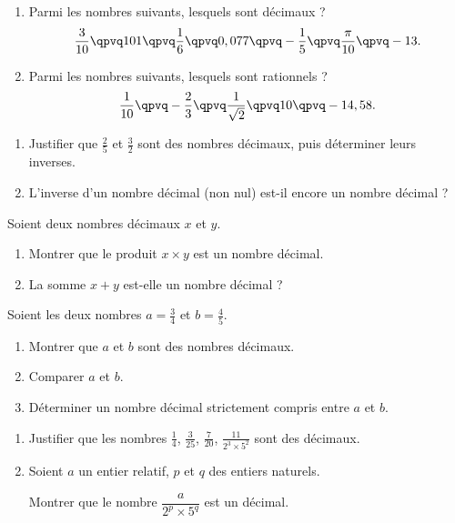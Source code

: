 
\exo

\begin{enumerate}
\item Parmi les nombres suivants, lesquels sont décimaux ?
\[\frac{3}{10} \qpvq 101 \qpvq \frac{1}{6} \qpvq 0,077 \qpvq -\frac{1}{5} \qpvq \frac{\pi}{10} \qpvq -13.\]
\item Parmi les nombres suivants, lesquels sont rationnels ?
\[\frac{1}{10} \qpvq -\frac{2}{3} \qpvq \frac{1}{\sqrt{2}} \qpvq 10 \qpvq -14,58.\]
\end{enumerate}

\exo

\begin{enumerate}
\item Justifier que $\frac{2}{5}$ et $\frac{3}{2}$ sont des nombres décimaux, puis déterminer leurs inverses.
\item L'inverse d'un nombre décimal (non nul) est-il encore un nombre décimal ?
\end{enumerate}

\exo

Soient deux nombres décimaux $x$ et $y$.
\begin{enumerate}
\item Montrer que le produit $x\times y$ est un nombre décimal.
\item La somme $x+y$ est-elle un nombre décimal ?
\end{enumerate}

\exo

Soient les deux nombres $a=\frac{3}{4}$ et $b=\frac{4}{5}$.
\begin{enumerate}
\item Montrer que $a$ et $b$ sont des nombres décimaux.
\item Comparer $a$ et $b$.
\item Déterminer un nombre décimal strictement compris entre $a$ et $b$.
\end{enumerate}

\exo

\begin{enumerate}
\item Justifier que les nombres $\frac{1}{4}$, $\frac{3}{25}$, $\frac{7}{20}$, $\frac{11}{2^3\times 5^2}$ sont des décimaux.
\item Soient $a$ un entier relatif, $p$ et $q$ des entiers naturels.

Montrer que le nombre $\dfrac{a}{2^p\times 5^q}$ est un décimal.
\end{enumerate}

